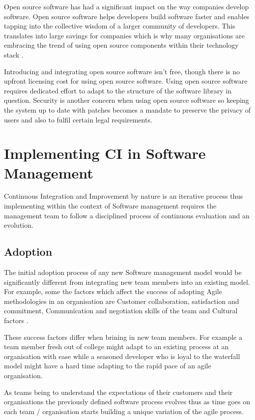 \documentclass[10pt,conference]{IEEEtran}
\begin{document}
Open source software has had a significant impact on the way companies develop software. Open source software helps developers build software faster and enables tapping into the collective wisdom of a larger community of developers. This translates into large savings for companies which is why many organisations are embracing the trend of using open source components within their technology stack \cite{baldwin_4_2014} \cite{lemmens_open_2008}.

Introducing and integrating open source software isn't free, though there is no upfront licensing cost for using open source software. Using open source software requires dedicated effort to adapt to the structure of the software library in question. Security is another concern when using open source software so keeping the system up to date with patches becomes a mandate to preserve the privacy of users and also to fulfil certain legal requirements.
 

\section*{Implementing CI in Software Management}

Continuous Integration and Improvement by nature is an iterative process thus implementing within the context of Software management requires the management team to follow a disciplined process of continuous evaluation and an evolution.

\subsection*{Adoption}
The initial adoption process of any new Software management model would be significantly different from integrating new team members into an existing model. For example, some the factors which affect the success of adopting Agile methodologies in an organisation are 
Customer collaboration, satisfaction and commitment, Communication and negotiation skills of the team and Cultural factors \cite{misra_identifying_2009}.

These success factors differ when brining in new team members. For example a team member fresh out of college might adapt to an existing process at an organisation with ease while a seasoned developer who is loyal to the waterfall model might have a hard time adapting to the rapid pace of an agile organisation. 

As teams being to understand the expectations of their customers and their organisations the previously defined software process evolves thus as time goes on each team / organisation starts building a unique variation of the agile process.
\end{document}
